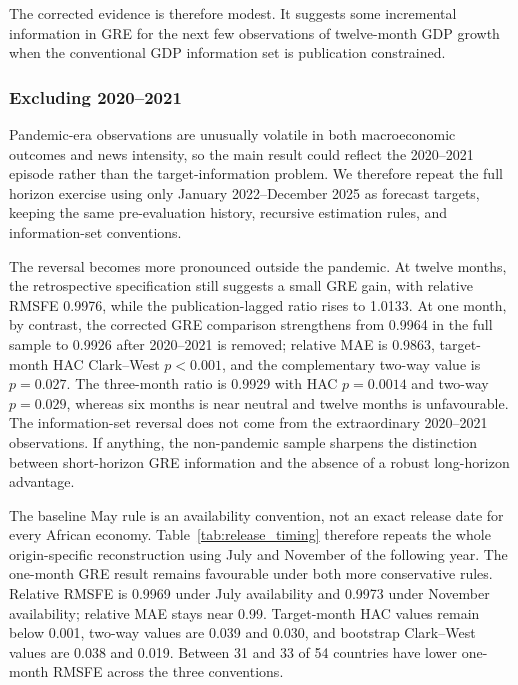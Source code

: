 \documentclass[preprint,12pt,authoryear]{elsarticle}
\begin{document}
The corrected evidence is therefore modest. It suggests some incremental
information in GRE for the next few observations of twelve-month GDP growth
when the conventional GDP information set is publication constrained.

\subsubsection{Excluding 2020--2021}

Pandemic-era observations are unusually volatile in both macroeconomic
outcomes and news intensity, so the main result could reflect the 2020--2021
episode rather than the target-information problem. We therefore repeat the
full horizon exercise using only January 2022--December 2025 as forecast
targets, keeping the same pre-evaluation history, recursive estimation rules,
and information-set conventions.



The reversal becomes more pronounced outside the pandemic. At twelve months,
the retrospective specification still suggests a small GRE gain, with relative
RMSFE 0.9976, while the publication-lagged ratio rises to 1.0133. At one
month, by contrast, the corrected GRE comparison strengthens from 0.9964 in
the full sample to 0.9926 after 2020--2021 is removed; relative MAE is 0.9863,
target-month HAC Clark--West $p < 0.001$, and the complementary two-way value
is $p = 0.027$. The three-month ratio is 0.9929 with HAC $p = 0.0014$ and
two-way $p = 0.029$, whereas six months is near neutral and twelve months is
unfavourable. The information-set reversal does not come from the
extraordinary 2020--2021 observations. If anything, the non-pandemic sample
sharpens the distinction between short-horizon GRE information and the absence
of a robust long-horizon advantage.

The baseline May rule is an availability convention, not an exact release date
for every African economy. Table~\ref{tab:release_timing} therefore repeats the
whole origin-specific reconstruction using July and November of the following
year. The one-month GRE result remains favourable under both more conservative
rules. Relative RMSFE is 0.9969 under July availability and 0.9973 under
November availability; relative MAE stays near 0.99. Target-month HAC values
remain below 0.001, two-way values are 0.039 and 0.030, and bootstrap
Clark--West values are 0.038 and 0.019. Between 31 and 33 of 54 countries have
lower one-month RMSFE across the three conventions.
\end{document}
